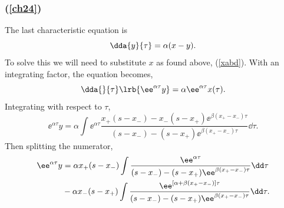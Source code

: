 \subsubsection*{(\ref{ch24})}
The last characteristic equation is
$$\dda{y}{\tau} = \alpha(x-y).$$
To solve this we will need to substitute $x$ as found above, (\ref{xabd}). With an integrating factor, the equation becomes,
$$\dda{}{\tau}\lrb{\ee^{\alpha\tau} y} = \alpha \ee^{\alpha\tau} x(\tau).$$
Integrating with respect to $\tau$,
$$\ee^{\alpha\tau }y = \alpha\int \ee^{\alpha\tau} \frac{x_+(s-x_-) - x_-(s-x_+)\ee^{\beta(x_+-x_-)\tau}}{(s-x_-) - (s-x_+)\ee^{\beta(x_+-x_-) \tau}} \dd\tau.$$
Then splitting the numerator,
\begin{align}
\label{bigdoubleints}
\ee^{\alpha\tau }y &=  \alpha x_+(s-x_-) \int \frac{ \ee^{\alpha \tau} } {(s-x_-) - (s-x_+)\ee^{\beta(x_+-x_-) \tau}}\dd\tau \notag \\
&-\alpha x_-(s-x_+)\int\frac{\ee^{\left[ \alpha + \beta(x_+-x_-) \right]\tau}}{(s-x_-) - (s-x_+)\ee^{\beta(x_+-x_-) \tau}}\dd\tau.
\end{align}

